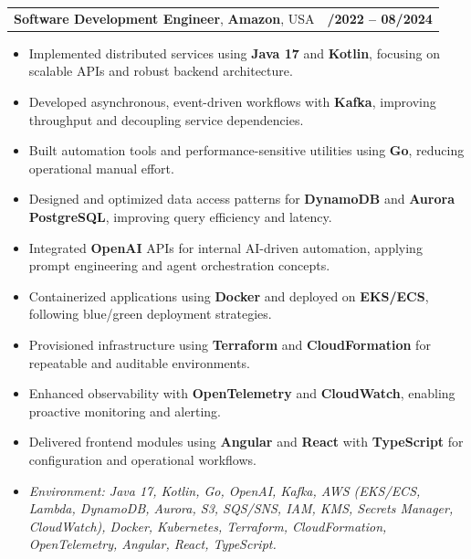 \documentclass[letterpaper,11pt]{article}
\makeatletter
\newcommand{\resumeItem}[1]{
  \item\footnotesize{
    {#1 \vspace{-2pt}}
  }
}
\newcommand{\resumeSubheading}[4]{
  \vspace{-2pt}\item
    \begin{tabular*}{1.0\textwidth}[t]{l@{\extracolsep{\fill}}r}
      \textbf{\fontsize{10pt}{14pt}\selectfont #3}, \textbf{\fontsize{10pt}{14pt}\selectfont #1}, \fontsize{10pt}{14pt}\selectfont #4 & \textbf{\fontsize{10pt}{14pt}\selectfont #2} \\
    \end{tabular*}\vspace{-7pt}
}
\newcommand{\resumeItemListStart}{\begin{itemize}[leftmargin=*]}
\newcommand{\resumeItemListEnd}{\end{itemize}\vspace{-5pt}}
\makeatother
\begin{document}
\resumeSubheading
{Amazon}{10/2022 -- 08/2024}
{Software Development Engineer}{USA}
\resumeItemListStart
  \resumeItem{Implemented distributed services using \textbf{Java 17} and \textbf{Kotlin}, focusing on scalable APIs and robust backend architecture.}
  \resumeItem{Developed asynchronous, event-driven workflows with \textbf{Kafka}, improving throughput and decoupling service dependencies.}
  \resumeItem{Built automation tools and performance-sensitive utilities using \textbf{Go}, reducing operational manual effort.}
  \resumeItem{Designed and optimized data access patterns for \textbf{DynamoDB} and \textbf{Aurora PostgreSQL}, improving query efficiency and latency.}
  \resumeItem{Integrated \textbf{OpenAI} APIs for internal AI-driven automation, applying prompt engineering and agent orchestration concepts.}
  \resumeItem{Containerized applications using \textbf{Docker} and deployed on \textbf{EKS/ECS}, following blue/green deployment strategies.}
  \resumeItem{Provisioned infrastructure using \textbf{Terraform} and \textbf{CloudFormation} for repeatable and auditable environments.}
  \resumeItem{Enhanced observability with \textbf{OpenTelemetry} and \textbf{CloudWatch}, enabling proactive monitoring and alerting.}
  \resumeItem{Delivered frontend modules using \textbf{Angular} and \textbf{React} with \textbf{TypeScript} for configuration and operational workflows.}
  \resumeItem{\textit{Environment: Java 17, Kotlin, Go, OpenAI, Kafka, AWS (EKS/ECS, Lambda, DynamoDB, Aurora, S3, SQS/SNS, IAM, KMS, Secrets Manager, CloudWatch), Docker, Kubernetes, Terraform, CloudFormation, OpenTelemetry, Angular, React, TypeScript.}}
\resumeItemListEnd
\end{document}
